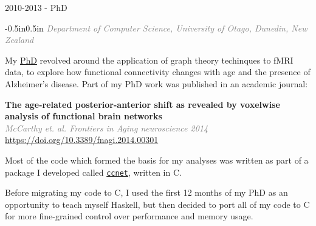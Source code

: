 \documentclass{resume}
\begin{document}
\begin{category}{2010-2013 - PhD}
\citemnobullet
\begin{changemargin}{-0.5in}{0.5in}
\textcolor{grey}{\textit{Department of Computer Science, University of Otago, Dunedin, New Zealand}}
\end{changemargin}

\citemnobullet My \href{https://ourarchive.otago.ac.nz/handle/10523/4864}{PhD} revolved around the application of graph
theory techinques to fMRI data, to explore how functional
connectivity changes with age and the presence of Alzheimer’s
disease. Part of my PhD work was published in an academic journal:\newline

{\small\small\textbf{The age-related posterior-anterior shift as revealed by voxelwise analysis of functional brain networks}\\ \textcolor{grey}{\textit{McCarthy et. al. Frontiers in Aging neuroscience 2014}}}\\ \mbox{\small\url{https://doi.org/10.3389/fnagi.2014.00301}}\leavevmode\newline

Most of the code which formed the basis for my analyses was written as
part of a package I developed called \href{https://github.com/pauldmccarthy/ccnet}{\texttt{ccnet}},
written in C.\newline

Before migrating my code to C, I used the first 12 months of my PhD as
an opportunity to teach myself Haskell, but then decided to port all
of my code to C for more fine-grained control over performance and
memory usage.

\end{category}
\end{document}
